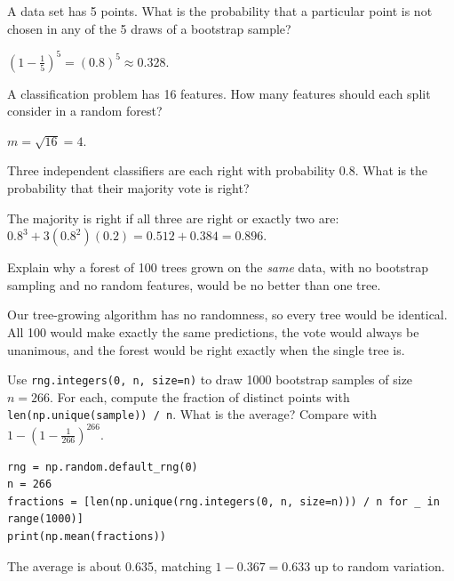 \begin{Exercise}[label=bag1, title=Probability a point is left out]
A data set has 5 points. What is the probability that a particular point is not chosen in any of the 5 draws of
a bootstrap sample?
\end{Exercise}
\begin{Answer}[ref=bag1]
$(1 - \frac{1}{5})^5 = (0.8)^5 \approx 0.328$.
\end{Answer}

\begin{Exercise}[label=bag2, title=Choosing m]
A classification problem has 16 features. How many features should each split consider in a random forest?
\end{Exercise}
\begin{Answer}[ref=bag2]
$m = \sqrt{16} = 4$.
\end{Answer}

\begin{Exercise}[label=bag3, title={Three voters}, space=3cm]
Three independent classifiers are each right with probability 0.8. What is the probability that their majority
vote is right?
\end{Exercise}
\begin{Answer}[ref=bag3]
The majority is right if all three are right or exactly two are:
$0.8^3 + 3(0.8^2)(0.2) = 0.512 + 0.384 = 0.896$.
\end{Answer}

\begin{Exercise}[label=bag4, title={Copies do not help}]
Explain why a forest of 100 trees grown on the \emph{same} data, with no bootstrap sampling and no random
features, would be no better than one tree.
\end{Exercise}
\begin{Answer}[ref=bag4]
Our tree-growing algorithm has no randomness, so every tree would be identical. All 100 would make exactly the
same predictions, the vote would always be unanimous, and the forest would be right exactly when the single tree
is.
\end{Answer}

\begin{Exercise}[label=bag5, title={Simulate a bootstrap}]
Use \verb|rng.integers(0, n, size=n)| to draw 1000 bootstrap samples of size $n = 266$. For each, compute the
fraction of distinct points with \verb|len(np.unique(sample)) / n|. What is the average? Compare with
$1 - (1 - \frac{1}{266})^{266}$.
\end{Exercise}
\begin{Answer}[ref=bag5]
\begin{verbatim}
rng = np.random.default_rng(0)
n = 266
fractions = [len(np.unique(rng.integers(0, n, size=n))) / n for _ in range(1000)]
print(np.mean(fractions))
\end{verbatim}
The average is about 0.635, matching $1 - 0.367 = 0.633$ up to random variation.
\end{Answer}

